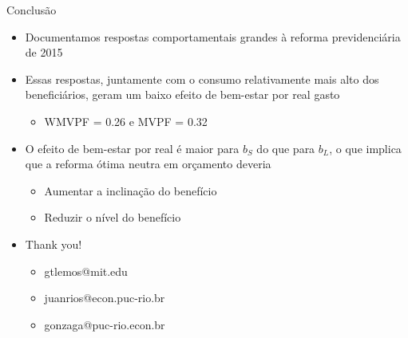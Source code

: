 \begin{frame}{Conclusão}
    \begin{itemize}
        \item Documentamos respostas comportamentais grandes à reforma previdenciária de 2015
        \item Essas respostas, juntamente com o consumo relativamente mais alto dos beneficiários, geram um baixo efeito de bem-estar por real gasto
        \begin{itemize}
            \item WMVPF = 0.26 e MVPF = 0.32
        \end{itemize}
        \item O efeito de bem-estar por real é maior para $b_S$ do que para $b_L$, o que implica que a reforma ótima neutra em orçamento deveria
        \begin{itemize}
            \item Aumentar a inclinação do benefício
            \item Reduzir o nível do benefício
        \end{itemize}
    \end{itemize}
\end{frame}

\begin{frame}
    \begin{itemize}
        \item Thank you!
        \begin{itemize}
            \item gtlemos@mit.edu
            \item juanrios@econ.puc-rio.br
            \item gonzaga@puc-rio.econ.br
            
            
        \end{itemize}
    \end{itemize}
\end{frame}

\appendix


